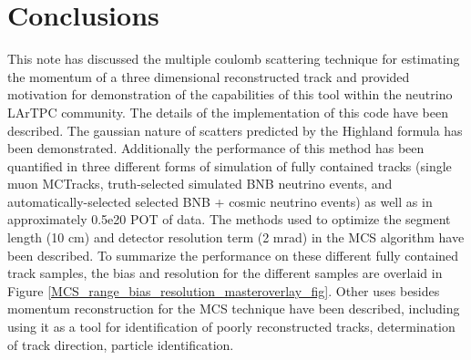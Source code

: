 \section{Conclusions}\label{conclusion_section}

This note has discussed the multiple coulomb scattering technique for estimating the momentum of a three dimensional reconstructed track and provided motivation for demonstration of the capabilities of this tool within the neutrino LArTPC community. The details of the implementation of this code have been described. The gaussian nature of scatters predicted by the Highland formula has been demonstrated. Additionally the performance of this method has been quantified in three different forms of simulation of fully contained tracks (single muon {\sc MCTracks}, truth-selected simulated BNB neutrino events, and automatically-selected selected BNB + cosmic neutrino events) as well as in approximately 0.5e20 POT of {\ub} data. The methods used to optimize the segment length (10 cm) and detector resolution term (2 mrad) in the MCS algorithm have been described. To summarize the performance on these different fully contained track samples, the bias and resolution for the different samples are overlaid in Figure \ref{MCS_range_bias_resolution_masteroverlay_fig}. Other uses besides momentum reconstruction for the MCS technique have been described, including using it as a tool for identification of poorly reconstructed tracks, determination of track direction, particle identification. 


